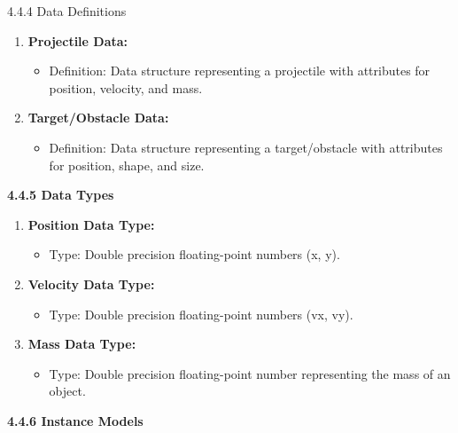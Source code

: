 \documentclass[
]{article}
\begin{document}
4.4.4 Data Definitions

\begin{enumerate}
\def\labelenumi{\arabic{enumi}.}
\item
  \textbf{Projectile Data:}

  \begin{itemize}
  \item
    Definition: Data structure representing a projectile with attributes
    for position, velocity, and mass.
  \end{itemize}
\item
  \textbf{Target/Obstacle Data:}

  \begin{itemize}
  \item
    Definition: Data structure representing a target/obstacle with
    attributes for position, shape, and size.
  \end{itemize}
\end{enumerate}

\textbf{4.4.5 Data Types}

\begin{enumerate}
\def\labelenumi{\arabic{enumi}.}
\item
  \textbf{Position Data Type:}

  \begin{itemize}
  \item
    Type: Double precision floating-point numbers (x, y).
  \end{itemize}
\item
  \textbf{Velocity Data Type:}

  \begin{itemize}
  \item
    Type: Double precision floating-point numbers (vx, vy).
  \end{itemize}
\item
  \textbf{Mass Data Type:}

  \begin{itemize}
  \item
    Type: Double precision floating-point number representing the mass
    of an object.
  \end{itemize}
\end{enumerate}

\textbf{4.4.6 Instance Models}
\end{document}
